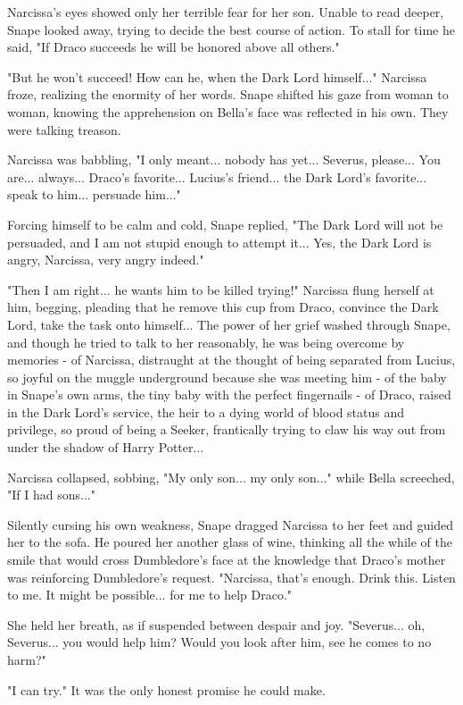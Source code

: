 \documentclass[a4paper,11pt]{article}
\begin{document}
Narcissa's eyes showed only her terrible fear for her son. Unable to read deeper, Snape looked away, trying to decide the best course of action. To stall for time he said, "If Draco succeeds he will be honored above all others."

"But he won't succeed! How can he, when the Dark Lord himself..." Narcissa froze, realizing the enormity of her words. Snape shifted his gaze from woman to woman, knowing the apprehension on Bella's face was reflected in his own. They were talking treason.

Narcissa was babbling, "I only meant... nobody has yet... Severus, please... You are... always... Draco's favorite... Lucius's friend... the Dark Lord's favorite... speak to him... persuade him..."

Forcing himself to be calm and cold, Snape replied, "The Dark Lord will not be persuaded, and I am not stupid enough to attempt it... Yes, the Dark Lord is angry, Narcissa, very angry indeed."

"Then I am right... he wants him to be killed trying!" Narcissa flung herself at him, begging, pleading that he remove this cup from Draco, convince the Dark Lord, take the task onto himself... The power of her grief washed through Snape, and though he tried to talk to her reasonably, he was being overcome by memories - of Narcissa, distraught at the thought of being separated from Lucius, so joyful on the muggle underground because she was meeting him - of the baby in Snape's own arms, the tiny baby with the perfect fingernails - of Draco, raised in the Dark Lord's service, the heir to a dying world of blood status and privilege, so proud of being a Seeker, frantically trying to claw his way out from under the shadow of Harry Potter...

Narcissa collapsed, sobbing, "My only son... my only son..." while Bella screeched, "If I had sons..."

Silently cursing his own weakness, Snape dragged Narcissa to her feet and guided her to the sofa. He poured her another glass of wine, thinking all the while of the smile that would cross Dumbledore's face at the knowledge that Draco's mother was reinforcing Dumbledore's request. "Narcissa, that's enough. Drink this. Listen to me. It might be possible... for me to help Draco."

She held her breath, as if suspended between despair and joy. "Severus... oh, Severus... you would help him? Would you look after him, see he comes to no harm?"

"I can try." It was the only honest promise he could make.
\end{document}
